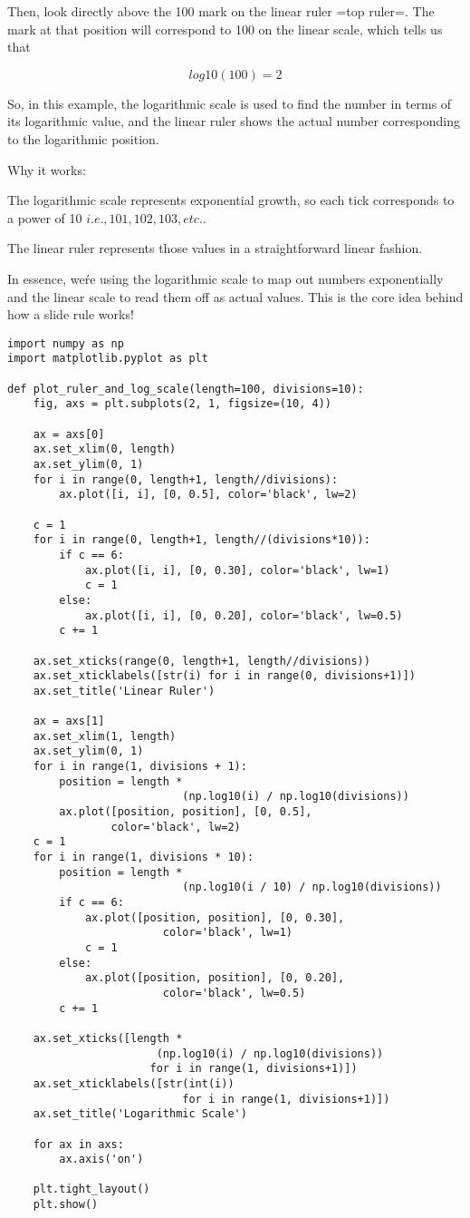 \documentclass[10pt,twocolumn]{article}
\begin{document}
Then, look directly above the 100 mark on the linear ruler =top ruler=. The mark at that position will correspond to 100 on the linear scale, which tells us that 

\[
log10(100) = 2
\]

So, in this example, the logarithmic scale is used to find the number in terms of its logarithmic value, and the linear ruler shows the actual number corresponding to the logarithmic position.

Why it works:

The logarithmic scale represents exponential growth, so each tick corresponds to a power of 10 \( i.e., 101,102,103, etc. \).

The linear ruler represents those values in a straightforward linear fashion.

In essence, we\'re using the logarithmic scale to map out numbers exponentially and the linear scale to read them off as actual values. This is the core idea behind how a slide rule works!

\small
\begin{verbatim}
import numpy as np
import matplotlib.pyplot as plt

def plot_ruler_and_log_scale(length=100, divisions=10):
    fig, axs = plt.subplots(2, 1, figsize=(10, 4))

    ax = axs[0]
    ax.set_xlim(0, length)
    ax.set_ylim(0, 1)
    for i in range(0, length+1, length//divisions):
        ax.plot([i, i], [0, 0.5], color='black', lw=2)

    c = 1
    for i in range(0, length+1, length//(divisions*10)):
        if c == 6:
            ax.plot([i, i], [0, 0.30], color='black', lw=1)
            c = 1
        else:
            ax.plot([i, i], [0, 0.20], color='black', lw=0.5)
        c += 1

    ax.set_xticks(range(0, length+1, length//divisions))
    ax.set_xticklabels([str(i) for i in range(0, divisions+1)])
    ax.set_title('Linear Ruler')

    ax = axs[1]
    ax.set_xlim(1, length)
    ax.set_ylim(0, 1)
    for i in range(1, divisions + 1):
        position = length * 
				           (np.log10(i) / np.log10(divisions))
        ax.plot([position, position], [0, 0.5], 
				color='black', lw=2)
    c = 1
    for i in range(1, divisions * 10):
        position = length * 
				           (np.log10(i / 10) / np.log10(divisions))
        if c == 6:
            ax.plot([position, position], [0, 0.30], 
						color='black', lw=1)
            c = 1
        else:
            ax.plot([position, position], [0, 0.20], 
						color='black', lw=0.5)
        c += 1

    ax.set_xticks([length * 
		               (np.log10(i) / np.log10(divisions)) 
		              for i in range(1, divisions+1)])
    ax.set_xticklabels([str(int(i)) 
		                   for i in range(1, divisions+1)])
    ax.set_title('Logarithmic Scale')

    for ax in axs:
        ax.axis('on')

    plt.tight_layout()
    plt.show()
\end{verbatim}
\end{document}
